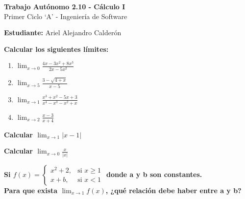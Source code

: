 \documentclass[answers]{exam} %
\begin{document}
\begin{center}
	\large\textbf{Trabajo Autónomo 2.10 - Cálculo I}\\[1em]
	\large Primer Ciclo \enquote*{A} - Ingeniería de Software\\[1em]
\end{center}

\vspace{0.5cm}
\large\textbf{Estudiante:} Ariel Alejandro Calderón
\vspace{0.5cm}

\begin{questions}

	\question \large\textbf{Calcular los siguientes límites:}
	\begin{enumerate}[label=\alph*.]
		\item $\displaystyle \lim_{x\to{0}} \frac{4x-3x^2+8x^3}{2x-5x^2}$
		\item $\displaystyle \lim_{x\to{5}} \frac{3-\sqrt{4+x}}{x-5}$
		\item $\displaystyle \lim_{x\to{1}} \frac{x^3+x^2-5x+3}{x^4-x^3-x^2+x}$
		\item $\displaystyle \lim_{x\to{2}} \frac{x-3}{x+4}$
	\end{enumerate}
	\begin{solution}

	\end{solution}

	\vspace{0.5cm}

	\question \large\textbf{Calcular $\displaystyle \lim_{x\to{1}} |x-1|$}
	\begin{solution}
	\end{solution}

	\newpage

	\question \large\textbf{Calcular $\displaystyle \lim_{x\to{0}} \frac{x}{|x|}$}
	\begin{solution}
	\end{solution}

	\vspace{0.5cm}

	\question \large\textbf{Si $ f(x) =
			\begin{cases}
				x^2+2, & \text{si } x \geq 1 \\
				x+b,   & \text{si } x < 1
			\end{cases}
		$ donde a y b son constantes. \\[1em] Para que exista $\displaystyle \lim_{x\to{1}} f(x)$, ¿qué relación debe haber entre a y b?}
	\begin{solution}
	\end{solution}


\end{questions}
\end{document}
